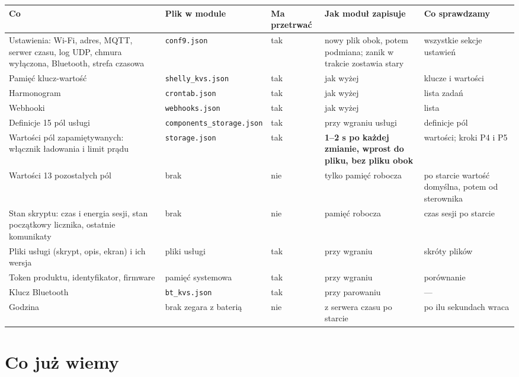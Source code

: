 \documentclass[11pt,a4paper]{article}
\begin{document}
\begin{longtable}{>{\raggedright\arraybackslash}p{4.67cm}>{\raggedright\arraybackslash}p{2.53cm}>{\raggedright\arraybackslash}p{1.82cm}>{\raggedright\arraybackslash}p{3.02cm}>{\raggedright\arraybackslash}p{2.36cm}}
\toprule
\rowcolor{apteallight}\textbf{Co} & \textbf{Plik w module} & \textbf{Ma przetrwać} & \textbf{Jak moduł zapisuje} & \textbf{Co sprawdzamy} \\
\midrule\endhead
\bottomrule\endfoot
Ustawienia: Wi-Fi, adres, MQTT, serwer czasu, log UDP, chmura wyłączona, Bluetooth, strefa czasowa & \texttt{conf9.json} & tak & nowy plik obok, potem podmiana; zanik w trakcie zostawia stary & wszystkie sekcje ustawień \\
Pamięć klucz-wartość & \texttt{shelly\_\allowbreak{}kvs.\allowbreak{}json} & tak & jak wyżej & klucze i wartości \\
Harmonogram & \texttt{crontab.json} & tak & jak wyżej & lista zadań \\
Webhooki & \texttt{webhooks.\allowbreak{}json} & tak & jak wyżej & lista \\
Definicje 15 pól usługi & \texttt{components\_\allowbreak{}storage.\allowbreak{}json} & tak & przy wgraniu usługi & definicje pól \\
Wartości pól zapamiętywanych: włącznik ładowania i limit prądu & \texttt{storage.json} & tak & \textbf{1–2 s po każdej zmianie, wprost do pliku, bez pliku obok} & wartości; kroki P4 i P5 \\
Wartości 13 pozostałych pól & brak & nie & tylko pamięć robocza & po starcie wartość domyślna, potem od sterownika \\
Stan skryptu: czas i energia sesji, stan początkowy licznika, ostatnie komunikaty & brak & nie & pamięć robocza & czas sesji po starcie \\
Pliki usługi (skrypt, opis, ekran) i ich wersja & pliki usługi & tak & przy wgraniu & skróty plików \\
Token produktu, identyfikator, firmware & pamięć systemowa & tak & przy wgraniu & porównanie \\
Klucz Bluetooth & \texttt{bt\_kvs.json} & tak & przy parowaniu & — \\
Godzina & brak zegara z baterią & nie & z serwera czasu po starcie & po ilu sekundach wraca \\
\end{longtable}

\section*{Co już wiemy}
\end{document}
